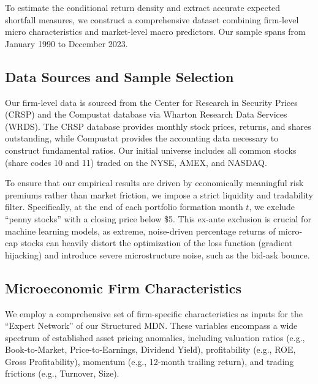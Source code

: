 \documentclass[12pt]{article}
\begin{document}
To estimate the conditional return density and extract accurate expected shortfall measures, we construct a comprehensive dataset combining firm-level micro characteristics and market-level macro predictors. Our sample spans from January 1990 to December 2023.

\subsection{Data Sources and Sample Selection}
\label{subsec:data_sources}

Our firm-level data is sourced from the Center for Research in Security Prices (CRSP) and the Compustat database via Wharton Research Data Services (WRDS). The CRSP database provides monthly stock prices, returns, and shares outstanding, while Compustat provides the accounting data necessary to construct fundamental ratios. Our initial universe includes all common stocks (share codes 10 and 11) traded on the NYSE, AMEX, and NASDAQ.

To ensure that our empirical results are driven by economically meaningful risk premiums rather than market friction, we impose a strict liquidity and tradability filter. Specifically, at the end of each portfolio formation month $t$, we exclude ``penny stocks'' with a closing price below \$5. This ex-ante exclusion is crucial for machine learning models, as extreme, noise-driven percentage returns of micro-cap stocks can heavily distort the optimization of the loss function (gradient hijacking) and introduce severe microstructure noise, such as the bid-ask bounce.

\subsection{Microeconomic Firm Characteristics}
\label{subsec:micro_features}

We employ a comprehensive set of firm-specific characteristics as inputs for the ``Expert Network'' of our Structured MDN. These variables encompass a wide spectrum of established asset pricing anomalies, including valuation ratios (e.g., Book-to-Market, Price-to-Earnings, Dividend Yield), profitability (e.g., ROE, Gross Profitability), momentum (e.g., 12-month trailing return), and trading frictions (e.g., Turnover, Size). 
\end{document}
